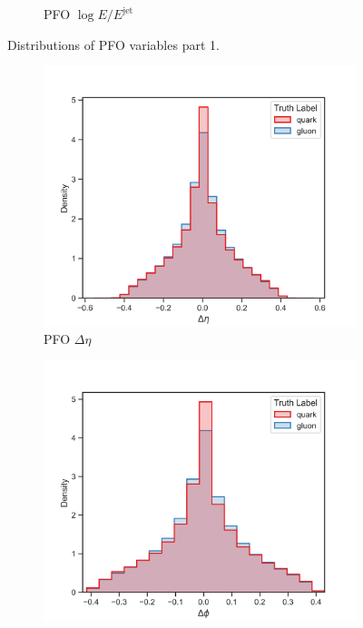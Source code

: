 \begin{figure}[!htb]
\begin{subfigure}[t]{0.45\textwidth}
        \caption{PFO $\log E / E^{\mathrm{jet}}$}
        \label{fig:app_pfo_log_E_over_E_jet}
    \end{subfigure}
\caption{Distributions of PFO variables part 1.}
\label{fig:app_pfo_variables_1}
\end{figure}

\begin{figure}[!htb]
    \begin{subfigure}[t]{0.45\textwidth}
        \includegraphics[width=\linewidth]{src/plots/distributions/PFOs/deltaEta.png}
        \caption{PFO $\Delta\eta$}
        \label{fig:app_pfo_deltaEta}
    \end{subfigure}
    \begin{subfigure}[t]{0.45\textwidth}
        \includegraphics[width=\linewidth]{src/plots/distributions/PFOs/deltaPhi.png}

\end{subfigure}
\end{figure}
